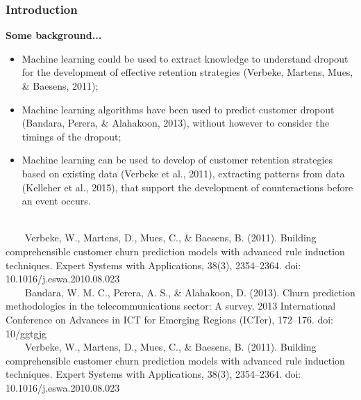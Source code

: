 \documentclass[10pt]{beamer}
\begin{document}
\begin{frame}
	\frametitle{Introduction}
	\Large
	\textbf{Some background...}\\
		\begin{itemize} \normalsize
			\item Machine learning could be used to extract knowledge to understand dropout for the development of effective retention strategies \footnotesize(Verbeke, Martens, Mues, \& Baesens, 2011)\normalsize;
			\item Machine learning algorithms have been used to predict customer dropout \footnotesize(Bandara, Perera, \& Alahakoon, 2013)\normalsize, without however to consider the timings of the dropout;
			\item Machine learning can be used to develop of customer retention strategies based on existing data \footnotesize(Verbeke et al., 2011)\normalsize, extracting patterns from data \footnotesize(Kelleher et al., 2015)\normalsize, that support the development of counteractions before an event occurs. \\~\\
		\end{itemize}	
	\tiny
	~~~~Verbeke, W., Martens, D., Mues, C., \& Baesens, B. (2011). Building comprehensible customer churn prediction models with advanced rule induction techniques. Expert Systems with Applications, 38(3), 2354–2364. doi: 10.1016/j.eswa.2010.08.023 \\
	~~~~Bandara, W. M. C., Perera, A. S., \& Alahakoon, D. (2013). Churn prediction methodologies in the telecommunications sector: A survey. 2013 International Conference on Advances in ICT for Emerging Regions (ICTer), 172–176. doi: 10/ggtgjg\\
	~~~~Verbeke, W., Martens, D., Mues, C., \& Baesens, B. (2011). Building comprehensible customer churn prediction models with advanced rule induction techniques. Expert Systems with Applications, 38(3), 2354–2364. doi: 10.1016/j.eswa.2010.08.023\\
\end{frame}
\end{document}
